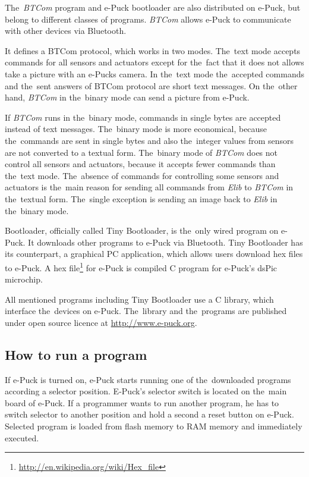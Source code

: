   The~{\it BTCom} program and e-Puck bootloader are also distributed on e-Puck, but belong to different classes of programs. 
  {\it BTCom} allows e-Puck to communicate with other devices via Bluetooth.
  
  It defines a BTCom protocol, which works in two modes. The~text mode accepts commands for
  all sensors and actuators except for the~fact that it does not allows take a picture 
  with an e-Pucks camera. 
  In the~text mode the~accepted commands and the~sent answers of BTCom protocol are short text messages.
  On the~other hand, {\it BTCom} in the~binary mode can send a picture from e-Puck.
  
  If {\it BTCom} runs in the~binary mode, commands in single bytes are accepted instead of text messages.
  The~binary mode is more economical, 
  because the~commands are sent in single bytes and also the~integer values from sensors
  are not converted to a textual form.
  The~binary mode of {\it BTCom} does not control all sensors and actuators, because it accepts fewer commands than the~text mode.
  The~absence of commands for controlling some sensors and actuators is the~main reason 
  for sending all commands from {\it Elib} to {\it BTCom} in the~textual form. 
  The~single exception is sending an image back to {\it Elib} in the~binary mode.
   
  Bootloader, officially called Tiny Bootloader\cite{tiny},
  is the~only wired program on e-Puck. It downloads	other programs to e-Puck via Bluetooth. 
  Tiny Bootloader has its counterpart, a graphical PC application,
  which allows users download hex files to e-Puck.
  A hex file\footnote{\small{\url{http://en.wikipedia.org/wiki/Hex_file}}} 
  for e-Puck is compiled C program for e-Puck's dsPic microchip. 
   
  All mentioned programs including Tiny Bootloader use a C library, which interface the~devices on e-Puck. 
  The~library and the~programs are published under open source licence at
  \url{http://www.e-puck.org}.

  \subsection*{How to run a program} %
  If e-Puck is turned on, e-Puck starts running one of the~downloaded programs according a selector 
  position. E-Puck's selector switch is located on the~main board of e-Puck.
  If a programmer wants to run another program, he has to switch selector to another position
  and hold a second a reset button on e-Puck.	Selected program is loaded from flash memory
  to RAM memory and immediately executed.	
   
